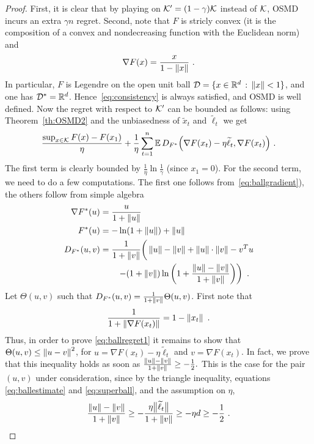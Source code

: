 \begin{proof}
First, it is clear that by playing on $\mathcal{K}' = (1-\gamma)\mathcal{K}$ instead of $\mathcal{K}$, OSMD incurs an extra $\gamma n$ regret. Second, note that $F$ is stricly convex (it is the composition of a convex and nondecreasing function with the Euclidean norm) and
\begin{equation} \label{eq:ballgradient}
\nabla F (x) = \frac{x}{1 - \left\|{x}\right\|}~.
\end{equation}
In particular, $F$ is Legendre on the open unit ball $\mathcal{D} = \{x \in \mathbb{R}^d \,:\, \left\|{x}\right\| < 1 \}$, and one has $\mathcal{D}^* = \mathbb{R}^d$. Hence~\eqref{eq:consistency} is always satisfied, and OSMD is well defined. Now the regret with respect to $\mathcal{K}'$ can be bounded as follows: using Theorem~\ref{th:OSMD2} and the unbiasedness of $\tilde{x}_t$ and $\tilde{\ell}_t$ we get
$$\frac{\sup_{x \in \mathcal{K}} F(x) - F(x_1)}{\eta} + \frac{1}{\eta} \sum_{t=1}^n \mathbb{E}\,D_{F^*}\Bigl(\nabla F(x_t) - \eta \widetilde{\ell}_t, \nabla F(x_t)\Bigr)~.$$
The first term is clearly bounded by $\frac{1}{\eta}\ln\frac{1}{\gamma}$ (since $x_1 = 0$). For the second term, we need to do a few computations. The first one follows from~\eqref{eq:ballgradient}), the others follow from simple algebra
\begin{align*}
\nabla F^* (u) & = \frac{u}{1 + \left\|{u}\right\|}\\
F^*(u) & = - \ln (1 + \left\|{u}\right\|) + \left\|{u}\right\|\\
D_{F^*}(u, v) & = \frac{1}{1+\left\|{v}\right\|} \bigg(\left\|{u}\right\| - \left\|{v}\right\| + \left\|{u}\right\| \cdot \left\|{v}\right\| - v^T u   \\
& \qquad \left. - (1+\left\|{v}\right\|) \ln \left( 1 + \frac{\left\|{u}\right\| - \left\|{v}\right\|}{1 + \left\|{v}\right\|}\right) \right)~.
\end{align*}
Let $\Theta(u,v)$ such that $D_{F^*}(u, v) = \frac{1}{1+\left\|{v}\right\|} \Theta(u,v)$. First note that 
\begin{equation} \label{eq:superball}
\frac{1}{1+\left\|{\nabla F (x_t)}\right\|} = 1 - \left\|{x_t}\right\|~.
\end{equation}
Thus, in order to prove \eqref{eq:ballregret1} it remains to show that $\Theta(u,v) \leq \left\|{u - v}\right\|^2$, for $ u = \nabla F(x_t) - \eta \tilde{\ell}_t$ and $v = \nabla F(x_t)$. In fact, we prove that this inequality holds as soon as $\frac{\left\|{u}\right\| - \left\|{v}\right\|}{1 + \left\|{v}\right\|} \geq - \frac{1}{2} .$ This is the case for the pair $(u,v)$ under consideration, since by the triangle inequality, equations \eqref{eq:ballestimate} and \eqref{eq:superball}, and the assumption on $\eta$,
$$\frac{\left\|{u}\right\| - \left\|{v}\right\|}{1 + \left\|{v}\right\|}  \geq - \frac{\eta \big\|\widetilde{\ell}_t\big\|}{1 + \left\|{v}\right\|} \geq - \eta d \geq - \frac{1}{2}~.$$

\end{proof}
